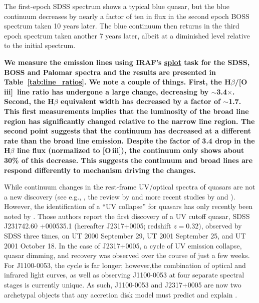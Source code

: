 \documentclass[a4paper,fleqn,usenatbib]{mnras}
\begin{document}
The first-epoch
SDSS spectrum shows a typical blue quasar, but the blue continuum
decreases by nearly a factor of ten in flux in the second epoch BOSS
spectrum taken 10 years later. The blue continuum then returns in the
third epoch spectrum taken another 7 years later, albeit at a
diminished level relative to the initial spectrum. 

{\bf
We measure the emission lines using IRAF's
\href{http://stsdas.stsci.edu/cgi-bin/gethelp.cgi?splot.hlp}{splot}
task for the SDSS, BOSS and Palomar spectra and the results are
presented in Table~\ref{tab:line_ratios}.  We note a couple of things.
First, the H$\beta$/[O\,{\sc iii}]\ line ratio has undergone a large
change, decreasing by $\sim$3.4$\times$.  Second, the H$\beta$
equivalent width has decreased by a factor of $\sim$1.7.
This first measurements implies that the luminosity of the broad line
region has significantly changed relative to the narrow line region.
The second point suggests that the continuum has decreased at a
different rate than the broad line emission. Despite the factor of 3.4 
drop in the H$\beta$ line flux (normalized to [O\,{\sc iii}]), the
continuum only shows about 30\% of this decrease.  This suggests the
continuum and broad lines are respond differently to mechanism driving
the changes. }

While continuum changes in the rest-frame UV/optical spectra of
quasars are not a new discovery (see e.g., \citealt{Clavel1991}, the
review by \citealt{Ulrich1997} and more recent studies by
\citealt{VandenBerk2004, Pereyra2006, MacLeod2010} and
\citealt{Guo2016b}). However, the identification of a ``UV collapse''
for quasars has only recently been noted by \cite{Guo2016}.  Those
authors report the first discovery of a UV cutoff quasar, SDSS
J231742.60 +000535.1 (hereafter J2317+0005; redshift $z = 0.32$),
observed by SDSS three times, on UT 2000 September 29, UT 2001
September 25, and UT 2001 October 18. In the case of J2317+0005, a
cycle of UV emission collapse, quasar dimming, and recovery was
observed over the course of just a few weeks. For J1100-0053, the
cycle is far longer; however,the combination of optical and infrared
light curves, as well as observing J1100-0053 at four separate
spectral stages is currently unique. As such, J1100-0053 and
J2317+0005 are now two archetypal objects that any accretion disk
model must predict and explain \citep[e.g.,][]{Lawrence2018}.
\end{document}
